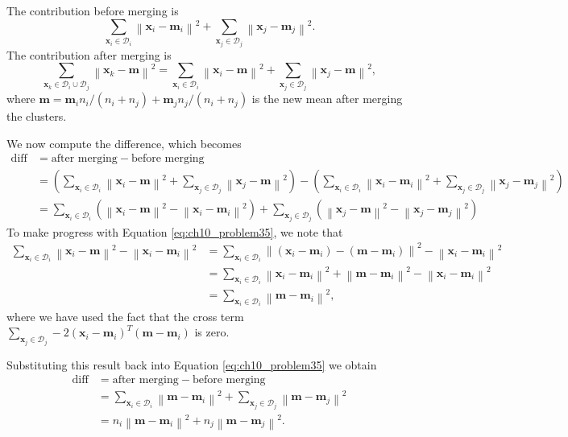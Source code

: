 \documentclass[12pt, a4paper]{article}
\newcommand{\D}{\mathcal{D}}
\newcommand{\vect}[1]{\bm{#1}}
\newcommand{\norm}[1]{\left\lVert#1\right\rVert}
\begin{document}
{The contribution before merging is
\begin{equation*}
	\sum_{\vect{x}_i \in \D_i} \norm{\vect{x}_i - \vect{m}_i}^2
	+
	\sum_{\vect{x}_j \in \D_j} \norm{\vect{x}_j - \vect{m}_j}^2.
\end{equation*}
The contribution after merging is
\begin{equation*}
	\sum_{\vect{x}_k \in \D_i \cup \D_j} \norm{\vect{x}_k - \vect{m}}^2
	=
	\sum_{\vect{x}_i \in \D_i} \norm{\vect{x}_i - \vect{m}}^2
	+
	\sum_{\vect{x}_j \in \D_j} \norm{\vect{x}_j - \vect{m}}^2,
\end{equation*}
where $\vect{m} = \vect{m}_i n_i / (n_i +n_j)  + \vect{m}_j n_j / (n_i +n_j) $ is the new mean after merging the clusters.

We now compute the difference, which becomes
\begin{align}
	\nonumber \text{diff} &= \text{after merging} - \text{before merging} \\
	 \nonumber&= \left( \sum_{\vect{x}_i \in \D_i} \norm{\vect{x}_i - \vect{m}}^2
	+
	\sum_{\vect{x}_j \in \D_j} \norm{\vect{x}_j - \vect{m}}^2 \right)
	-
	\left(
	\sum_{\vect{x}_i \in \D_i} \norm{\vect{x}_i - \vect{m}_i}^2
	+
	\sum_{\vect{x}_j \in \D_j} \norm{\vect{x}_j - \vect{m}_j}^2
	\right) \\
	 \label{eq:ch10_problem35} &=
	\sum_{\vect{x}_i \in \D_i}
	\left( \norm{\vect{x}_i - \vect{m}}^2 - \norm{\vect{x}_i - \vect{m}_i}^2 \right)
	+
	\sum_{\vect{x}_j \in \D_j}
	\left( \norm{\vect{x}_j - \vect{m}}^2 - \norm{\vect{x}_j - \vect{m}_j}^2 \right)
\end{align}
To make progress with Equation \eqref{eq:ch10_problem35}, we note that
\begin{align*}
	\sum_{\vect{x}_i \in \D_i} \norm{\vect{x}_i - \vect{m}}^2 - \norm{\vect{x}_i - \vect{m}_i}^2
	&=
	\sum_{\vect{x}_i \in \D_i} \norm{ (\vect{x}_i - \vect{m}_i) - (\vect{m} - \vect{m}_i)}^2 - \norm{\vect{x}_i - \vect{m}_i}^2 \\
	&= \sum_{\vect{x}_i \in \D_i} 
	\norm{ \vect{x}_i - \vect{m}_i}^2 
	+
	\norm{\vect{m} - \vect{m}_i}^2
	- \norm{\vect{x}_i - \vect{m}_i}^2 \\
	&= \sum_{\vect{x}_i \in \D_i} 
	\norm{\vect{m} - \vect{m}_i}^2,
\end{align*}
where we have used the fact that the cross term $\sum_{\vect{x}_j \in \D_j} -2 (\vect{x}_i - \vect{m}_i)^T (\vect{m} - \vect{m}_i)$ is zero. 

Substituting this result back into Equation \eqref{eq:ch10_problem35} we obtain
\begin{align}
\nonumber \text{diff} &= \text{after merging} - \text{before merging} \\
&= 
\nonumber \sum_{\vect{x}_i \in \D_i} 
\norm{\vect{m} - \vect{m}_i}^2 +
\sum_{\vect{x}_j \in \D_j} 
\norm{\vect{m} - \vect{m}_j}^2 \\
&= 
\label{eq:ch10problem35_2} n_i
\norm{\vect{m} - \vect{m}_i}^2 +
n_j
\norm{\vect{m} - \vect{m}_j}^2.
\end{align}

}
\end{document}
